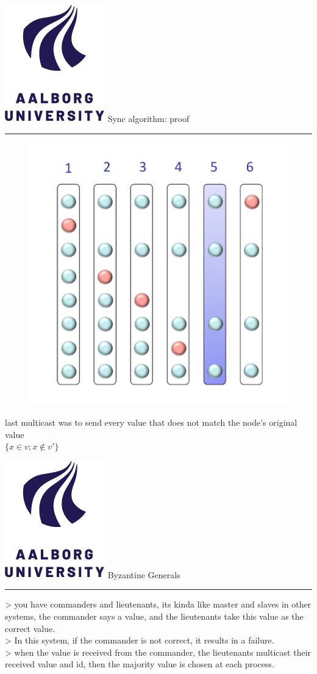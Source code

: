 \documentclass[aspectratio=1610,17pt,utf8]{beamer}
\newcommand{\regularframe}[1]{\color{black}\includegraphics[width=.05\textwidth]{figures/aau.png} #1\\\hrule}
\begin{document}
\begin{frame}{\regularframe{Sync algorithm: proof}}
    \begin{minipage}{.45\textwidth}
        \begin{figure}
            \includegraphics[height=\textwidth]{figures/consensus_proof.png}
        \end{figure}
    \end{minipage}
    \begin{minipage}{.45\textwidth}
        last multicast was to send every value that does not match the node's original value\\
        $\{x \in v; x \notin v'\}$
    \end{minipage}
\end{frame}

\begin{frame}{\regularframe{Byzantine Generals}}
    > you have commanders and lieutenants, its kinda like master and slaves in other systems, the commander says a value, and the lieutenants take this value as the correct value.\\
    > In this system, if the commander is not correct, it results in a failure.\\
    > when the value is received from the commander, the lieutenants multicast their received value and id, then the majority value is chosen at each process.
\end{frame}
\end{document}
